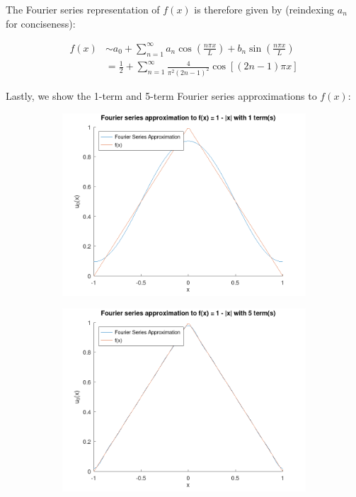 \begin{solution}
    \pagebreak
    The Fourier series representation of $f(x)$ is therefore given by (reindexing $a_n$ for conciseness): 

    \begin{align*}
    f(x) &\sim a_0 + \sum\limits_{n=1}^{\infty}{a_n \cos{\left(\frac{n \pi x}{L}\right)} + b_n \sin{\left(\frac{n \pi x}{L}\right)}} \\
         &= \frac{1}{2} + \sum\limits_{n=1}^{\infty}{\frac{4}{\pi^2 (2n - 1)^2} \cos{[(2n - 1) \pi x]}}
    \end{align*}

    Lastly, we show the 1-term and 5-term Fourier series approximations to $f(x)$:

    \begin{figure}[h]
        \centering
        \begin{subfigure}[b]{0.475\textwidth}
            \centering
            \includegraphics[width=\textwidth]{problem1_fourier_series_solution_1_term.png}
            \label{fig:problem1_5terms}
        \end{subfigure}
        \hfill
        \begin{subfigure}[b]{0.475\textwidth}
            \centering
            \includegraphics[width=\textwidth]{problem1_fourier_series_solution_5_term.png}

\end{subfigure}
\end{figure}
\end{solution}
